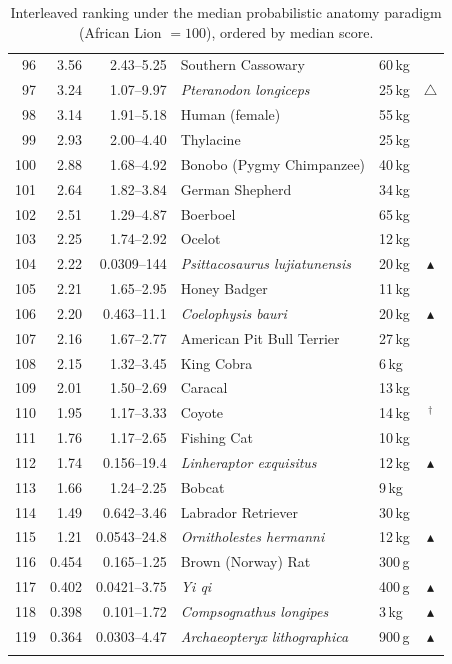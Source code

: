 \documentclass[11pt]{article}
\begin{document}
\begin{longtable}{rrrllc}
96 & 3.56 & 2.43--5.25 & Southern Cassowary & 60\,kg &  \\
97 & 3.24 & 1.07--9.97 & \textit{Pteranodon longiceps} & 25\,kg & $\triangle$ \\
98 & 3.14 & 1.91--5.18 & Human (female) & 55\,kg &  \\
99 & 2.93 & 2.00--4.40 & Thylacine & 25\,kg &  \\
100 & 2.88 & 1.68--4.92 & Bonobo (Pygmy Chimpanzee) & 40\,kg &  \\
101 & 2.64 & 1.82--3.84 & German Shepherd & 34\,kg &  \\
102 & 2.51 & 1.29--4.87 & Boerboel & 65\,kg &  \\
103 & 2.25 & 1.74--2.92 & Ocelot & 12\,kg &  \\
104 & 2.22 & 0.0309--144 & \textit{Psittacosaurus lujiatunensis} & 20\,kg & $\blacktriangle$ \\
105 & 2.21 & 1.65--2.95 & Honey Badger & 11\,kg &  \\
106 & 2.20 & 0.463--11.1 & \textit{Coelophysis bauri} & 20\,kg & $\blacktriangle$ \\
107 & 2.16 & 1.67--2.77 & American Pit Bull Terrier & 27\,kg &  \\
108 & 2.15 & 1.32--3.45 & King Cobra & 6\,kg &  \\
109 & 2.01 & 1.50--2.69 & Caracal & 13\,kg &  \\
110 & 1.95 & 1.17--3.33 & Coyote & 14\,kg & $^{\dagger}$ \\
111 & 1.76 & 1.17--2.65 & Fishing Cat & 10\,kg &  \\
112 & 1.74 & 0.156--19.4 & \textit{Linheraptor exquisitus} & 12\,kg & $\blacktriangle$ \\
113 & 1.66 & 1.24--2.25 & Bobcat & 9\,kg &  \\
114 & 1.49 & 0.642--3.46 & Labrador Retriever & 30\,kg &  \\
115 & 1.21 & 0.0543--24.8 & \textit{Ornitholestes hermanni} & 12\,kg & $\blacktriangle$ \\
116 & 0.454 & 0.165--1.25 & Brown (Norway) Rat & 300\,g &  \\
117 & 0.402 & 0.0421--3.75 & \textit{Yi qi} & 400\,g & $\blacktriangle$ \\
118 & 0.398 & 0.101--1.72 & \textit{Compsognathus longipes} & 3\,kg & $\blacktriangle$ \\
119 & 0.364 & 0.0303--4.47 & \textit{Archaeopteryx lithographica} & 900\,g & $\blacktriangle$ \\
\bottomrule
\caption{Interleaved ranking under the median probabilistic anatomy paradigm (African Lion $=100$), ordered by median score.}
\label{tab:interleaved}
\end{longtable}
\normalsize
\end{document}
